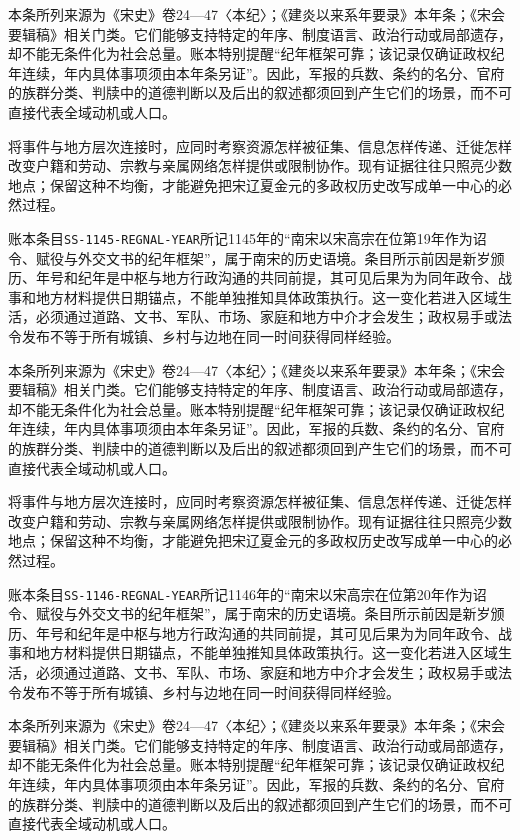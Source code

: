 本条所列来源为《宋史》卷24—47〈本纪〉；《建炎以来系年要录》本年条；《宋会要辑稿》相关门类。它们能够支持特定的年序、制度语言、政治行动或局部遗存，却不能无条件化为社会总量。账本特别提醒“纪年框架可靠；该记录仅确证政权纪年连续，年内具体事项须由本年条另证”。因此，军报的兵数、条约的名分、官府的族群分类、判牍中的道德判断以及后出的叙述都须回到产生它们的场景，而不可直接代表全域动机或人口。

将事件与地方层次连接时，应同时考察资源怎样被征集、信息怎样传递、迁徙怎样改变户籍和劳动、宗教与亲属网络怎样提供或限制协作。现有证据往往只照亮少数地点；保留这种不均衡，才能避免把宋辽夏金元的多政权历史改写成单一中心的必然过程。

账本条目\texttt{SS-1145-REGNAL-YEAR}所记1145年的“南宋以宋高宗在位第19年作为诏令、赋役与外交文书的纪年框架”，属于南宋的历史语境。条目所示前因是新岁颁历、年号和纪年是中枢与地方行政沟通的共同前提，其可见后果为为同年政令、战事和地方材料提供日期锚点，不能单独推知具体政策执行。这一变化若进入区域生活，必须通过道路、文书、军队、市场、家庭和地方中介才会发生；政权易手或法令发布不等于所有城镇、乡村与边地在同一时间获得同样经验。

本条所列来源为《宋史》卷24—47〈本纪〉；《建炎以来系年要录》本年条；《宋会要辑稿》相关门类。它们能够支持特定的年序、制度语言、政治行动或局部遗存，却不能无条件化为社会总量。账本特别提醒“纪年框架可靠；该记录仅确证政权纪年连续，年内具体事项须由本年条另证”。因此，军报的兵数、条约的名分、官府的族群分类、判牍中的道德判断以及后出的叙述都须回到产生它们的场景，而不可直接代表全域动机或人口。

将事件与地方层次连接时，应同时考察资源怎样被征集、信息怎样传递、迁徙怎样改变户籍和劳动、宗教与亲属网络怎样提供或限制协作。现有证据往往只照亮少数地点；保留这种不均衡，才能避免把宋辽夏金元的多政权历史改写成单一中心的必然过程。

账本条目\texttt{SS-1146-REGNAL-YEAR}所记1146年的“南宋以宋高宗在位第20年作为诏令、赋役与外交文书的纪年框架”，属于南宋的历史语境。条目所示前因是新岁颁历、年号和纪年是中枢与地方行政沟通的共同前提，其可见后果为为同年政令、战事和地方材料提供日期锚点，不能单独推知具体政策执行。这一变化若进入区域生活，必须通过道路、文书、军队、市场、家庭和地方中介才会发生；政权易手或法令发布不等于所有城镇、乡村与边地在同一时间获得同样经验。

本条所列来源为《宋史》卷24—47〈本纪〉；《建炎以来系年要录》本年条；《宋会要辑稿》相关门类。它们能够支持特定的年序、制度语言、政治行动或局部遗存，却不能无条件化为社会总量。账本特别提醒“纪年框架可靠；该记录仅确证政权纪年连续，年内具体事项须由本年条另证”。因此，军报的兵数、条约的名分、官府的族群分类、判牍中的道德判断以及后出的叙述都须回到产生它们的场景，而不可直接代表全域动机或人口。

